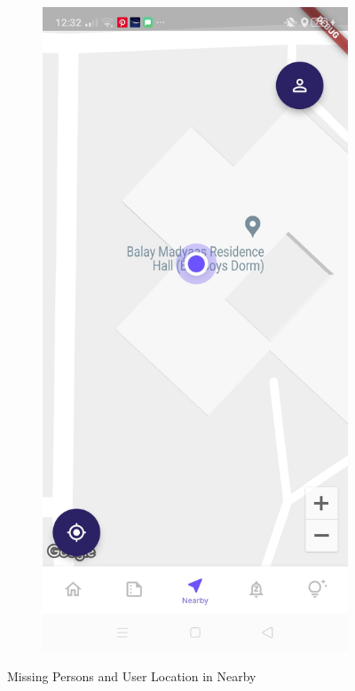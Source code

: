 \begin{figure}[!h]
\begin{subfigure}[c]{0.30\linewidth}
    \end{subfigure}
    \centering
    \begin{subfigure}[c]{0.30\linewidth}
        \centering
        \includegraphics[scale=0.15]{figures/Chapter4/Main/Nearby-2.jpg}
    \end{subfigure}
    \caption{Missing Persons and User Location in Nearby}
    \label{fig:userTracking}
\end{figure}
